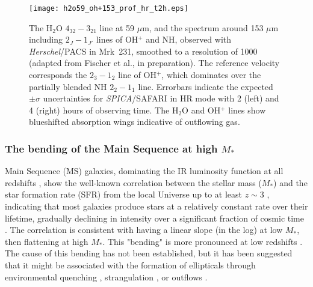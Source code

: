 \documentclass{pasa}%
\begin{document}
\begin{figure*}
\begin{center}
\texttt{[image: h2o59\_oh+153\_prof\_hr\_t2h.eps]}
\caption{The H$_2$O $4_{32}-3_{21}$ line at 59 $\mu$m, and the spectrum around
  153 $\mu$m including $2_{J}-1_{J'}$ lines of OH$^+$ and NH, observed with
  {\it Herschel}/PACS in Mrk~231, smoothed to a resolution of 1000 (adapted
  from Fischer et al., in preparation). The reference velocity corresponds
  the $2_{3}-1_{2}$ line of OH$^+$, which dominates over the partially blended
  NH $2_{2}-1_{1}$ line. Errorbars indicate the expected $\pm\sigma$ 
  uncertainties for {\it SPICA}/SAFARI in HR mode with 2 (left) and 4 (right)
  hours of observing time. The H$_2$O and OH$^+$ lines show blueshifted
  absorption wings indicative of outflowing gas.
} 
\label{h2ooh+}
\end{center}
\end{figure*}

\subsubsection{The bending of the Main Sequence at high $M_*$}
\label{sec:ms}


Main Sequence (MS) galaxies, dominating the IR luminosity function at all
redshifts \citep{gru13}, show the well-known correlation between the
stellar mass ($M_*$) and the star formation rate (SFR) 
from the local Universe up to at least $z\sim3$
\citep[e.g.][]{noe07,elb07,rod11,sch15}, indicating that 
most galaxies produce stars at a relatively constant rate over their
  lifetime, 
gradually declining in intensity over a significant fraction of cosmic time
\citep[e.g.][]{noe07,pen15}. 
The correlation is consistent with having a linear slope (in the log) at
  low $M_*$, then flattening at high $M_*$.  This "bending" is more pronounced
  at low redshifts \citep[e.g.][]{lee15,sch16}.
The cause of this bending has not been established, but it has been
  suggested that it might be associated with the formation of ellipticals
  through environmental quenching \citep[e.g.][]{dek06}, strangulation
  \citep{pen15}, or outflows \citep[negative feedback; e.g.][]{spr05}.
\end{document}
